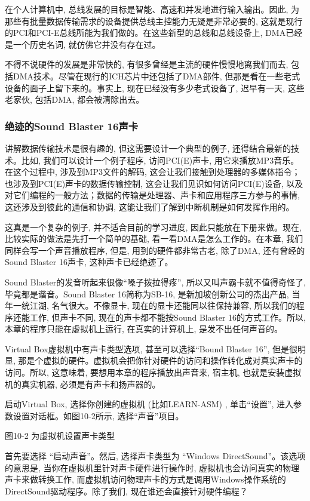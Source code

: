 \documentclass[12pt]{article}
\begin{document}
\begin{CJK}{UTF8}{gbsn}
在个人计算机中, 总线发展的目标是智能、高速和并发地进行输入输出。因此, 为那些有批量数据传输需求的设备提供总线主控能力无疑是非常必要的, 这就是现行的PCI和PCI-E总线所能为我们做的。在这些新型的总线和总线设备上, DMA已经是一个历史名词, 就仿佛它并没有存在过。

不得不说硬件的发展是非常快的, 有很多曾经是主流的硬件慢慢地离我们而去, 包括DMA技术。尽管在现行的ICH芯片中还包括了DMA部件, 但那是看在一些老式设备的面子上留下来的。事实上, 现在已经没有多少老式设备了, 迟早有一天, 这些老家伙, 包括DMA, 都会被清除出去。

\subsubsection{绝迹的Sound Blaster 16声卡}
讲解数据传输技术是很有趣的, 但这需要设计一个典型的例子, 还得结合最新的技术。比如, 我们可以设计一个例子程序, 访问PCI(E)声卡, 用它来播放MP3音乐。在这个过程中, 涉及到MP3文件的解码, 这会让我们接触到处理器的多媒体指令；也涉及到PCI(E)声卡的数据传输控制, 这会让我们见识如何访问PCI(E)设备, 以及对它们编程的一般方法；数据的传输是处理器、声卡和应用程序三方参与的事情, 这还涉及到彼此的通信和协调, 这能让我们了解到中断机制是如何发挥作用的。

这真是一个复杂的例子, 并不适合目前的学习进度, 因此只能放在下册来做。现在, 比较实际的做法是先打一个简单的基础, 看一看DMA是怎么工作的。在本章, 我们同样会写一个声音播放程序, 但是, 用到的硬件都非常古老, 除了DMA, 还有曾经的Sound Blaster 16声卡, 这种声卡已经绝迹了。

Sound Blaster的发音听起来很像“嗓子拨拉得疼”, 所以又叫声霸卡就不值得奇怪了, 毕竟都是谐音。Sound Blaster 16简称为SB-16, 是新加坡创新公司的杰出产品, 当年一统江湖, 名气很大。不像显卡, 现在的显卡还能同以往保持兼容, 所以我们的程序还能工作, 但声卡不同, 现在的声卡都不能按Sound Blaster 16的方式工作。所以, 本章的程序只能在虚拟机上运行, 在真实的计算机上, 是发不出任何声音的。

Virtual Box虚拟机中有声卡类型选项, 甚至可以选择“Bound Blaster 16”, 但是很明显, 那是个虚拟的硬件。虚拟机会把你针对硬件的访问和操作转化成对真实声卡的访问。所以, 这意味着, 要想用本章的程序播放出声音来, 宿主机, 也就是安装虚拟机的真实机器, 必须是有声卡和扬声器的。

启动Virtual Box, 选择你创建的虚拟机 (比如LEARN-ASM) , 单击“设置”, 进入参数设置对话框。如图10-2所示, 选择“声音”项目。
 
图10-2  为虚拟机设置声卡类型

首先要选择 ``启动声音''。然后, 选择声卡类型为 ``Windows DirectSound''。该选项的意思是, 当你在虚拟机里针对声卡硬件进行操作时, 虚拟机也会访问真实的物理声卡来做转换工作, 而虚拟机访问物理声卡的方式是调用Windows操作系统的DirectSound驱动程序。除了我们, 现在谁还会直接针对硬件编程？


\end{CJK}
\end{document}
